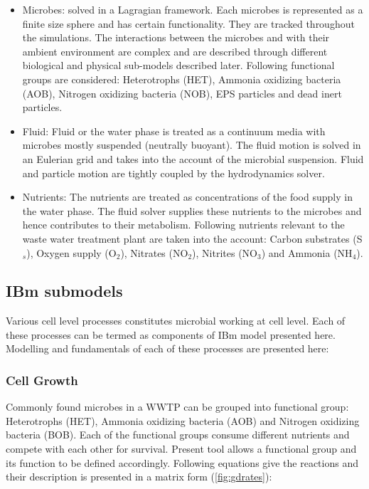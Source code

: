\documentclass[11pt,a4paper,openright]{article}
\begin{document}
\begin{itemize}
\item Microbes: solved in a Lagragian framework. Each microbes is represented as a finite size sphere and has certain functionality. They are tracked throughout the simulations. The interactions between the microbes and with their ambient environment are complex and are described through different biological and physical sub-models described later. Following functional groups are considered: Heterotrophs (HET), Ammonia oxidizing bacteria (AOB), Nitrogen oxidizing bacteria (NOB), EPS particles and dead inert particles. 

\item Fluid: Fluid or the water phase is treated as a continuum media with microbes mostly suspended (neutrally buoyant). The fluid motion is solved in an Eulerian grid and takes into the account of the microbial suspension. Fluid and particle motion are tightly coupled by the hydrodynamics solver. 

\item Nutrients: The nutrients are treated as concentrations of the food supply in the water phase. The fluid solver supplies these nutrients to the microbes and hence contributes to their metabolism. Following nutrients relevant to the waste water treatment plant are taken into the account: Carbon substrates (S$_s$), Oxygen supply (O$_2$), Nitrates (NO$_{2}$), Nitrites (NO$_{3}$) and Ammonia (NH$_{4}$).
\end{itemize}

\subsection{IBm submodels}
Various cell level processes constitutes microbial working at cell level. Each of these processes can be termed as components of IBm model presented here. Modelling and fundamentals of each of these processes are presented here:

\subsubsection{Cell Growth}\label{growthmol}
Commonly found microbes in a WWTP can be grouped into functional group: Heterotrophs (HET), Ammonia oxidizing bacteria (AOB) and Nitrogen oxidizing bacteria (BOB). Each of the functional groups consume different nutrients and compete with each other for survival. Present tool allows a functional group and its function to be defined accordingly. Following equations give the reactions and their description is presented in a matrix form (\ref{fig:gdrates}):
\end{document}
